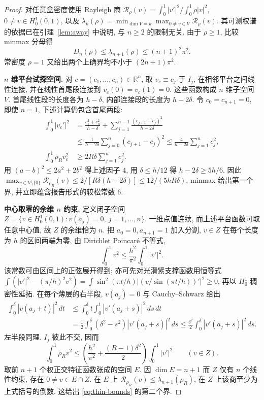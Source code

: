 \documentclass[UTF8]{ctexart}
\begin{document}
\begin{proof}
对任意盒密度使用 Rayleigh 商
$\mathcal R_\rho(v)=\int_0^1|v'|^2/\int_0^1\rho|v|^2$, $0\ne v\in H_0^1(0,1)$,
以及
$\lambda_k(\rho)=\min_{\dim V=k}\max_{0\ne v\in V}\mathcal R_\rho(v)$.
其可测权谱的依据已在引理~\ref{lem:away} 中说明, 与 $n\ge2$ 的限制无关.
由于 $\rho\ge1$, 比较 minmax 分母得
\begin{equation}\label{eq:sup-universal-upper}
D_n(\rho)\le\lambda_{n+1}(\rho)\le(n+1)^2\pi^2.
\end{equation}
常密度 $\rho=1$ 又给出两个上确界均不小于 $(2n+1)\pi^2$.

\textbf{$n$ 维平台试探空间.} 对 $c=(c_1,\dots,c_n)\in\mathbb R^n$, 取
$v_c\equiv c_j$ 于 $I_j$, 在相邻平台之间线性连接, 并在线性首尾段连接到
$v_c(0)=v_c(1)=0$. 这些函数构成 $n$ 维子空间 $V$.
首尾线性段的长度各为 $h-\delta$, 内部连接段的长度为 $h-2\delta$.
令 $c_0=c_{n+1}=0$, 即使 $n=1$, 下述计算仍包含首尾两段:
\begin{align*}
\int_0^1|v_c'|^2
&=\frac{c_1^2+c_n^2}{h-\delta}
+\sum_{j=1}^{n-1}\frac{(c_{j+1}-c_j)^2}{h-2\delta}\\
&\le\frac1{h-2\delta}\sum_{j=0}^{n}(c_{j+1}-c_j)^2
\le\frac4{h-2\delta}\sum_{j=1}^n c_j^2,\\
\int_0^1\rho_R v_c^2&\ge2R\delta\sum_{j=1}^n c_j^2.
\end{align*}
用 $(a-b)^2\le2a^2+2b^2$ 得上述因子 $4$, 用 $\delta\le h/12$ 得
$h-2\delta\ge5h/6$. 因此
$\max_{v\in V\setminus\{0\}}\mathcal R_{\rho_R}(v)
\le2/[R\delta(h-2\delta)]\le12/(5hR\delta)$,
minmax 给出第一个界, 并立即蕴含报告形式的较松常数 $6$.

\textbf{中心取零的余维 $n$ 约束.} 定义闭子空间
$Z=\{v\in H_0^1(0,1):v(a_j)=0,\ j=1,\dots,n\}$.
一维点值连续, 而上述平台函数可取任意中心值, 故 $Z$ 的余维恰为 $n$.
把 $a_0=0,a_{n+1}=1$ 加入分割, $v\in Z$ 在每个长度为 $h$ 的区间两端为零,
由 Dirichlet Poincar\'e 不等式,
\begin{equation*}
\int_0^1v^2\le\frac{h^2}{\pi^2}\int_0^1|v'|^2.
\end{equation*}
该常数可由区间上的正弦展开得到; 亦可先对光滑紧支撑函数用恒等式
$\int(|v'|^2-(\pi/h)^2v^2)
=\int\sin^2(\pi t/h)|(v/\sin(\pi t/h))'|^2\ge0$, 再以 $H_0^1$ 稠密性延拓.
在每个薄层的右半段, $v(a_j)=0$ 与 Cauchy--Schwarz 给出
\begin{align*}
\int_0^\delta|v(a_j+t)|^2\,dt
&\le\int_0^\delta t\int_0^t|v'(a_j+s)|^2\,ds\,dt\\
&=\frac12\int_0^\delta(\delta^2-s^2)|v'(a_j+s)|^2\,ds
\le\frac{\delta^2}{2}\int_0^\delta|v'(a_j+s)|^2\,ds.
\end{align*}
左半段同理. $I_j$ 彼此不交, 因而
\begin{equation*}
\int_0^1\rho_Rv^2
\le\left(\frac{h^2}{\pi^2}+\frac{(R-1)\delta^2}{2}\right)\int_0^1|v'|^2
\qquad(v\in Z).
\end{equation*}
取前 $n+1$ 个权正交特征函数张成的空间 $E$.
因 $\dim E=n+1$ 而 $Z$ 仅有 $n$ 个线性约束, 存在 $0\ne v\in E\cap Z$.
在 $E$ 上 $\mathcal R_{\rho_R}(v)\le\lambda_{n+1}(\rho_R)$,
在 $Z$ 上该商至少为上式括号的倒数. 这给出 \eqref{eq:thin-bounds} 的第二个界.


\end{proof}
\end{document}
